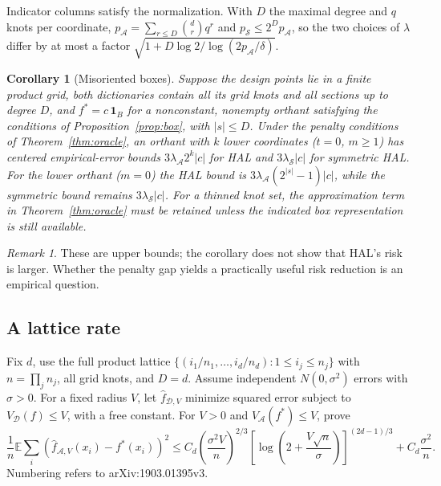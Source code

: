 \documentclass[11pt]{article}
\newtheorem{corollary}{Corollary}
\theoremstyle{definition}
\theoremstyle{remark}
\newtheorem{remark}{Remark}
\newcommand{\one}{\mathbf{1}}
\begin{document}
Indicator columns satisfy the normalization. With $D$ the maximal degree and
$q$ knots per coordinate, $p_{\mathcal{A}} = \sum_{r \le D}\binom{d}{r}q^r$
and $p_{\mathcal{S}} \le 2^D p_{\mathcal{A}}$, so the two choices of
$\lambda$ differ by at most a factor
$\sqrt{1 + D\log 2 / \log(2p_{\mathcal{A}}/\delta)}$.

\begin{corollary}[Misoriented boxes]\label{cor:orient}
Suppose the design points lie in a finite product grid, both dictionaries
contain all its grid knots and all sections up to degree $D$, and
$f^*=c\,\one_B$ for a nonconstant, nonempty orthant satisfying the
conditions of Proposition~\ref{prop:box}, with $|s|\le D$. Under the
penalty conditions of Theorem~\ref{thm:oracle}, an orthant with $k$ lower
coordinates ($t=0$, $m\ge1$) has centered empirical-error bounds
$3\lambda_{\mathcal{A}} 2^k |c|$ for HAL and $3\lambda_{\mathcal{S}} |c|$ for
symmetric HAL. For the lower orthant ($m=0$) the HAL bound is
$3\lambda_{\mathcal{A}}(2^{|s|}-1)|c|$, while the symmetric bound remains
$3\lambda_{\mathcal{S}}|c|$.
For a thinned knot set, the approximation term in
Theorem~\ref{thm:oracle} must be retained unless the indicated box
representation is still available.
\end{corollary}

\begin{remark}
These are upper bounds; the corollary does not show that HAL's risk is
larger. Whether the penalty gap yields a practically useful risk reduction
is an empirical question.
\end{remark}

\subsection{A lattice rate}

Fix $d$, use the full product lattice
$\{(i_1/n_1,\ldots,i_d/n_d):1\le i_j\le n_j\}$ with
$n=\prod_j n_j$, all grid knots, and $D=d$. Assume independent
$N(0,\sigma^2)$ errors with $\sigma>0$. For a fixed radius $V$, let
$\hat f_{\mathcal D,V}$ minimize squared error subject to
$V_{\mathcal D}(f)\le V$, with a free constant. For $V>0$ and
$V_{\mathcal A}(f^*)\le V$, \citet[Theorem~4.5]{fang2021} prove
\begin{equation}\label{eq:fgs}
 \frac1n\mathbb E\sum_i(\hat f_{\mathcal A,V}(x_i)-f^*(x_i))^2
 \le C_d\left(\frac{\sigma^2V}{n}\right)^{2/3}
 \left[\log\left(2+\frac{V\sqrt n}{\sigma}\right)\right]^{(2d-1)/3}
 +C_d\frac{\sigma^2}{n}.
\end{equation}
Numbering refers to arXiv:1903.01395v3.
\end{document}
